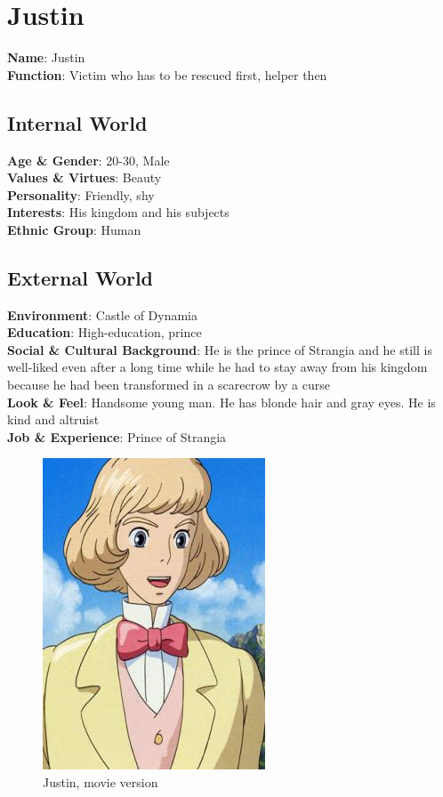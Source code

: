 \section{Justin}

\begin{minipage}{0.5\textwidth}
\textbf{Name}: Justin \\
\textbf{Function}: Victim who has to be rescued first, helper then

\subsection{Internal World}

\textbf{Age \& Gender}: 20-30, Male \\
\textbf{Values \& Virtues}: Beauty \\
\textbf{Personality}: Friendly, shy \\
\textbf{Interests}: His kingdom and his subjects \\
\textbf{Ethnic Group}: Human

\subsection{External World}
\textbf{Environment}: Castle of Dynamia \\
\textbf{Education}: High-education, prince \\
\textbf{Social \& Cultural Background}: He is the prince of Strangia and he still is well-liked even after a long time while he had to stay away from his kingdom because he had been transformed in a scarecrow by a curse \\
\textbf{Look \& Feel}: Handsome young man. He has blonde hair and gray eyes. He is kind and altruist \\
\textbf{Job \& Experience}: Prince of Strangia \\

\end{minipage}%
%
\hfill\begin{minipage}{0.4\textwidth}
  \begin{figure}[H]
  \includegraphics{Images/Characters/justin}
  \caption{Justin, movie version }
\end{figure}
\end{minipage}

